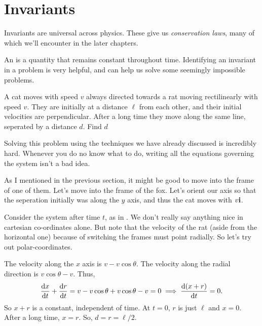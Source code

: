    \section{Invariants}

    Invariants are universal across physics. These give us \emph{conservation laws}, many of which we'll encounter in the 
    later chapters.

    An  is a quantity that remains constant throughout time. Identifying an invariant in a problem is very
    helpful, and can help us solve some seemingly impossible problems. 

        \begin{example}
            A cat moves with speed $v$ always directed towards a rat moving rectilinearly with speed $v$. They are initially at a distance $\ell$ from each other, 
            and their initial velocities are perpendicular. After a long time they move along the same line, seperated
            by a distance $d$. Find $d$ 
            
            \begin{soln}
                    Solving this problem using the techniques we have already discussed is incredibly hard. 
                    Whenever you do no know what to do, writing all the equations governing the system isn't a bad idea.
                    
                    As I mentioned in the previous section, it might be good to move into the frame of one 
                    of them. Let's move into the frame of the fox. Let's orient our axis so that the seperation initially 
                    was along the $y$ axis, and thus the cat moves with $v\mathbf{\boldsymbol{i}}$. 

                    Consider the system after time $t$, as in . We don't really 
                    say anything nice in cartesian co-ordinates alone. But note that the velocity of the rat (aside from the 
                    horizontal one) because of switching the frames must point radially. So let's try out 
                    polar-coordinates. 
                    
                    The velocity along the $x$ axis 
                    is $v - v\cos\theta$. The velocity along the radial direction is $v\cos\theta - v$. Thus,
                    \[
                        \dv{x}{t} + \dv{r}{t} = v - v\cos\theta + v\cos\theta - v = 0 \implies \dv{(x + r)}{t} = 0.
                    \]
                    So $x + r$ is a constant, independent of time. At $t = 0$, $r$ is just $\ell$ and $x = 0$. After a long 
                    time, $x = r$. So, $d = r = \ell/2$. 
            \end{soln}
        \end{example}

